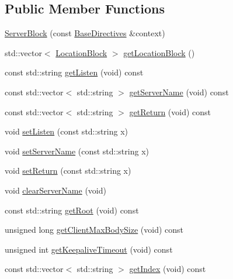 \subsection*{Public Member Functions}
\begin{DoxyCompactItemize}
\item 
\hyperlink{classft_1_1_server_block_ac14b720cf43fb61943107d397f5427f4}{Server\+Block} (const \hyperlink{classft_1_1_base_directives}{Base\+Directives} \&context)
\item 
std\+::vector$<$ \hyperlink{classft_1_1_location_block}{Location\+Block} $>$ \hyperlink{classft_1_1_server_block_abad572e5e2d99f3c9d53005ad8c2bcf9}{get\+Location\+Block} ()
\item 
const std\+::string \hyperlink{classft_1_1_server_block_afc115b2997340935536bf8135e02b68c}{get\+Listen} (void) const
\item 
const std\+::vector$<$ std\+::string $>$ \hyperlink{classft_1_1_server_block_aa14d06f644ee8148fa9e2ee53d9625f9}{get\+Server\+Name} (void) const
\item 
const std\+::vector$<$ std\+::string $>$ \hyperlink{classft_1_1_server_block_aeef5e4710c02406c46e54d4aa0c8f57c}{get\+Return} (void) const
\item 
void \hyperlink{classft_1_1_server_block_a0f0253aecea7200c5b8dabdfff638909}{set\+Listen} (const std\+::string x)
\item 
void \hyperlink{classft_1_1_server_block_a89dfb84333debfc1871f28ef625f9556}{set\+Server\+Name} (const std\+::string x)
\item 
void \hyperlink{classft_1_1_server_block_a041d07c701e052b114ef353d5e588998}{set\+Return} (const std\+::string x)
\item 
void \hyperlink{classft_1_1_server_block_aaf4aa7d96124b157e91274eb88c77808}{clear\+Server\+Name} (void)
\item 
const std\+::string \hyperlink{classft_1_1_base_directives_aa5dbcb08bda0a0e7e502d2df7cf64287}{get\+Root} (void) const
\item 
unsigned long \hyperlink{classft_1_1_base_directives_a930398ba1e4b99b2ba01a60dcda0c923}{get\+Client\+Max\+Body\+Size} (void) const
\item 
unsigned int \hyperlink{classft_1_1_base_directives_ab8574338758f65325cab5d1c394826c8}{get\+Keepalive\+Timeout} (void) const
\item 
const std\+::vector$<$ std\+::string $>$ \hyperlink{classft_1_1_base_directives_a018f34a5ffd66e891494b5c0ee69177b}{get\+Index} (void) const
\item 

\end{DoxyCompactItemize}
